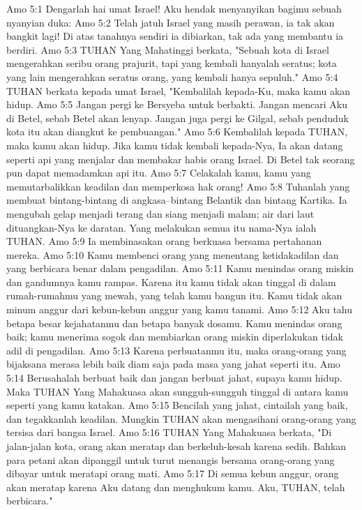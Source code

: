 Amo 5:1  Dengarlah hai umat Israel! Aku hendak menyanyikan bagimu sebuah nyanyian duka:
Amo 5:2  Telah jatuh Israel yang masih perawan, ia tak akan bangkit lagi! Di atas tanahnya sendiri ia dibiarkan, tak ada yang membantu ia berdiri.
Amo 5:3  TUHAN Yang Mahatinggi berkata, "Sebuah kota di Israel mengerahkan seribu orang prajurit, tapi yang kembali hanyalah seratus; kota yang lain mengerahkan seratus orang, yang kembali hanya sepuluh."
Amo 5:4  TUHAN berkata kepada umat Israel, "Kembalilah kepada-Ku, maka kamu akan hidup.
Amo 5:5  Jangan pergi ke Bersyeba untuk berbakti. Jangan mencari Aku di Betel, sebab Betel akan lenyap. Jangan juga pergi ke Gilgal, sebab penduduk kota itu akan diangkut ke pembuangan."
Amo 5:6  Kembalilah kepada TUHAN, maka kamu akan hidup. Jika kamu tidak kembali kepada-Nya, Ia akan datang seperti api yang menjalar dan membakar habis orang Israel. Di Betel tak seorang pun dapat memadamkan api itu.
Amo 5:7  Celakalah kamu, kamu yang memutarbalikkan keadilan dan memperkosa hak orang!
Amo 5:8  Tuhanlah yang membuat bintang-bintang di angkasa--bintang Belantik dan bintang Kartika. Ia mengubah gelap menjadi terang dan siang menjadi malam; air dari laut dituangkan-Nya ke daratan. Yang melakukan semua itu nama-Nya ialah TUHAN.
Amo 5:9  Ia membinasakan orang berkuasa bersama pertahanan mereka.
Amo 5:10  Kamu membenci orang yang menentang ketidakadilan dan yang berbicara benar dalam pengadilan.
Amo 5:11  Kamu menindas orang miskin dan gandumnya kamu rampas. Karena itu kamu tidak akan tinggal di dalam rumah-rumahmu yang mewah, yang telah kamu bangun itu. Kamu tidak akan minum anggur dari kebun-kebun anggur yang kamu tanami.
Amo 5:12  Aku tahu betapa besar kejahatanmu dan betapa banyak dosamu. Kamu menindas orang baik; kamu menerima sogok dan membiarkan orang miskin diperlakukan tidak adil di pengadilan.
Amo 5:13  Karena perbuatanmu itu, maka orang-orang yang bijaksana merasa lebih baik diam saja pada masa yang jahat seperti itu.
Amo 5:14  Berusahalah berbuat baik dan jangan berbuat jahat, supaya kamu hidup. Maka TUHAN Yang Mahakuasa akan sungguh-sungguh tinggal di antara kamu seperti yang kamu katakan.
Amo 5:15  Bencilah yang jahat, cintailah yang baik, dan tegakkanlah keadilan. Mungkin TUHAN akan mengasihani orang-orang yang tersisa dari bangsa Israel.
Amo 5:16  TUHAN Yang Mahakuasa berkata, "Di jalan-jalan kota, orang akan meratap dan berkeluh-kesah karena sedih. Bahkan para petani akan dipanggil untuk turut menangis bersama orang-orang yang dibayar untuk meratapi orang mati.
Amo 5:17  Di semua kebun anggur, orang akan meratap karena Aku datang dan menghukum kamu. Aku, TUHAN, telah berbicara."
